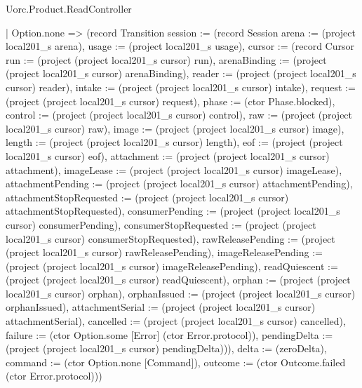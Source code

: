 \begin{lexlean}{Uorc.Product.ReadController}
\begin{semanticmodule}
{      | Option.none => (record Transition {session := (record Session {arena := (project local201_s arena), usage := (project local201_s usage), cursor := (record Cursor {run := (project (project local201_s cursor) run), arenaBinding := (project (project local201_s cursor) arenaBinding), reader := (project (project local201_s cursor) reader), intake := (project (project local201_s cursor) intake), request := (project (project local201_s cursor) request), phase := (ctor Phase.blocked), control := (project (project local201_s cursor) control), raw := (project (project local201_s cursor) raw), image := (project (project local201_s cursor) image), length := (project (project local201_s cursor) length), eof := (project (project local201_s cursor) eof), attachment := (project (project local201_s cursor) attachment), imageLease := (project (project local201_s cursor) imageLease), attachmentPending := (project (project local201_s cursor) attachmentPending), attachmentStopRequested := (project (project local201_s cursor) attachmentStopRequested), consumerPending := (project (project local201_s cursor) consumerPending), consumerStopRequested := (project (project local201_s cursor) consumerStopRequested), rawReleasePending := (project (project local201_s cursor) rawReleasePending), imageReleasePending := (project (project local201_s cursor) imageReleasePending), readQuiescent := (project (project local201_s cursor) readQuiescent), orphan := (project (project local201_s cursor) orphan), orphanIssued := (project (project local201_s cursor) orphanIssued), attachmentSerial := (project (project local201_s cursor) attachmentSerial), cancelled := (project (project local201_s cursor) cancelled), failure := (ctor Option.some [Error] (ctor Error.protocol)), pendingDelta := (project (project local201_s cursor) pendingDelta)})}), delta := (zeroDelta), command := (ctor Option.none [Command]), outcome := (ctor Outcome.failed (ctor Error.protocol))})
}
\end{semanticmodule}
\end{lexlean}
